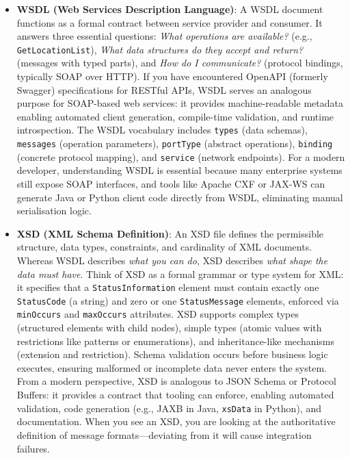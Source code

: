 \documentclass[11pt]{article}
\begin{document}
\begin{itemize}
  \item \textbf{WSDL (Web Services Description Language)}: A WSDL document functions as a formal contract between service provider and consumer. It answers three essential questions: \emph{What operations are available?} (e.g., \texttt{GetLocationList}), \emph{What data structures do they accept and return?} (messages with typed parts), and \emph{How do I communicate?} (protocol bindings, typically SOAP over HTTP). If you have encountered OpenAPI (formerly Swagger) specifications for RESTful APIs, WSDL serves an analogous purpose for SOAP-based web services: it provides machine-readable metadata enabling automated client generation, compile-time validation, and runtime introspection. The WSDL vocabulary includes \texttt{types} (data schemas), \texttt{messages} (operation parameters), \texttt{portType} (abstract operations), \texttt{binding} (concrete protocol mapping), and \texttt{service} (network endpoints). For a modern developer, understanding WSDL is essential because many enterprise systems still expose SOAP interfaces, and tools like Apache CXF or JAX-WS can generate Java or Python client code directly from WSDL, eliminating manual serialisation logic.

  \vspace{0.5em}
\noindent{}
  \vspace{0.5em}

  \item \textbf{XSD (XML Schema Definition)}: An XSD file defines the permissible structure, data types, constraints, and cardinality of XML documents. Whereas WSDL describes \emph{what you can do}, XSD describes \emph{what shape the data must have}. Think of XSD as a formal grammar or type system for XML: it specifies that a \texttt{StatusInformation} element must contain exactly one \texttt{StatusCode} (a string) and zero or one \texttt{StatusMessage} elements, enforced via \texttt{minOccurs} and \texttt{maxOccurs} attributes. XSD supports complex types (structured elements with child nodes), simple types (atomic values with restrictions like patterns or enumerations), and inheritance-like mechanisms (extension and restriction). Schema validation occurs before business logic executes, ensuring malformed or incomplete data never enters the system. From a modern perspective, XSD is analogous to JSON Schema or Protocol Buffers: it provides a contract that tooling can enforce, enabling automated validation, code generation (e.g., JAXB in Java, \texttt{xsData} in Python), and documentation. When you see an XSD, you are looking at the authoritative definition of message formats—deviating from it will cause integration failures.


\end{itemize}
\end{document}
